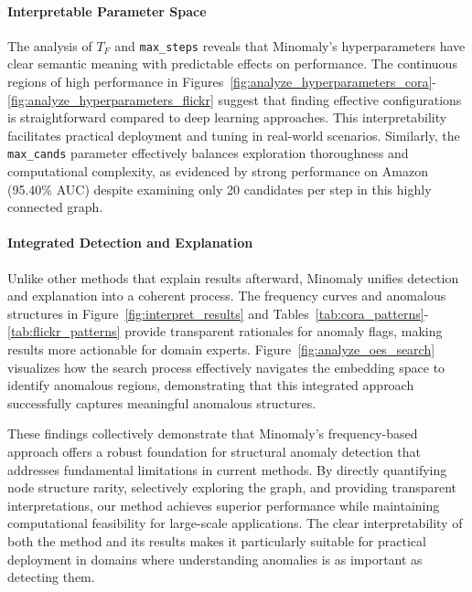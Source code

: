 \documentclass[pdflatex,sn-mathphys-num]{sn-jnl}%
\theoremstyle{thmstyleone}%
\theoremstyle{thmstyletwo}%
\theoremstyle{thmstylethree}%
\begin{document}
\paragraph{Interpretable Parameter Space}
The analysis of $T_F$ and \texttt{max\_steps} reveals that Minomaly's hyperparameters have clear semantic meaning with predictable effects on performance. The continuous regions of high performance in Figures~\ref{fig:analyze_hyperparameters_cora}-\ref{fig:analyze_hyperparameters_flickr} suggest that finding effective configurations is straightforward compared to deep learning approaches. This interpretability facilitates practical deployment and tuning in real-world scenarios. Similarly, the \texttt{max\_cands} parameter effectively balances exploration thoroughness and computational complexity, as evidenced by strong performance on Amazon (95.40\% AUC) despite examining only 20 candidates per step in this highly connected graph.

\paragraph{Integrated Detection and Explanation} Unlike other methods that explain results afterward, Minomaly unifies detection and explanation into a coherent process. The frequency curves and anomalous structures in Figure~\ref{fig:interpret_results} and Tables~\ref{tab:cora_patterns}-\ref{tab:flickr_patterns} provide transparent rationales for anomaly flags, making results more actionable for domain experts. Figure~\ref{fig:analyze_oes_search} visualizes how the search process effectively navigates the embedding space to identify anomalous regions, demonstrating that this integrated approach successfully captures meaningful anomalous structures.

These findings collectively demonstrate that Minomaly's frequency-based approach offers a robust foundation for structural anomaly detection that addresses fundamental limitations in current methods. By directly quantifying node structure rarity, selectively exploring the graph, and providing transparent interpretations, our method achieves superior performance while maintaining computational feasibility for large-scale applications. The clear interpretability of both the method and its results makes it particularly suitable for practical deployment in domains where understanding anomalies is as important as detecting them.

\end{document}
